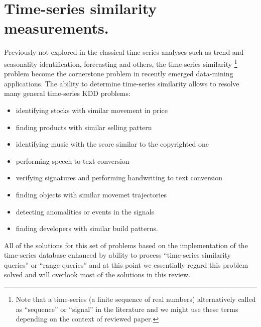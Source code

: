 \chapter{Time-series similarity measurements.}
Previously not explored in the classical time-series analyses such as trend and seasonality identification, forecasting and others, the time-series similarity \footnote{Note that a time-series (a finite sequence of real numbers) alternatively called as ``sequence'' or ``signal'' in the literature and we might use these terms depending on the context of reviewed paper.}  problem become the cornerstone problem in recently emerged data-mining applications. The ability to determine time-series similarity allows to resolve many general time-series KDD problems:
\begin{itemize}
	\item identifying stocks with similar movement in price \cite{citeulike:4295242} \cite{citeulike:4031865} \cite{citeulike:4025073}
	\item finding products with similar selling pattern \cite{citeulike:4326324}
	\item identifying music with the score similar to the copyrighted one \cite{citeulike:3821484} \cite{citeulike:3815076}
	\item performing speech to text conversion \cite{citeulike:3728228}
	\item verifying signatures and performing handwriting to text conversion \cite{citeulike:3733947} \cite{citeulike:3513035}
	\item finding objects with similar movemet trajectories \cite{citeulike:964832} \cite{citeulike:3728229} \cite{citeulike:3815864}
	\item detecting anomalities or events in the signals \cite{citeulike:4412621} \cite{citeulike:4412617}
	\item finding developers with similar build patterns.
\end{itemize}

All of the solutions for this set of problems based on the implementation of the time-series database enhanced by ability to process ``time-series similarity queries'' or ``range queries'' and at this point we essentially regard this problem solved and will overlook most of the solutions in this review. 

